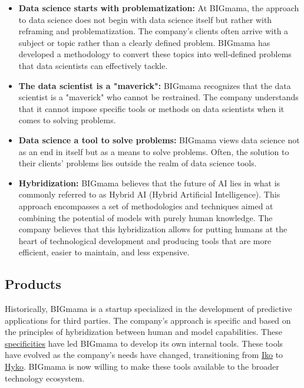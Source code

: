 \begin{itemize}
    \item \textbf{Data science starts with problematization:} At BIGmama, the approach to data science does not begin with data science itself but rather with reframing and problematization. The company's clients often arrive with a subject or topic rather than a clearly defined problem. BIGmama has developed a methodology to convert these topics into well-defined problems that data scientists can effectively tackle.

    \item \textbf{The data scientist is a "maverick":} BIGmama recognizes that the data scientist is a "maverick" who cannot be restrained. The company understands that it cannot impose specific tools or methods on data scientists when it comes to solving problems.

    \item \textbf{Data science a tool to solve problems:} BIGmama views data science not as an end in itself but as a means to solve problems. Often, the solution to their clients' problems lies outside the realm of data science tools.

    \item \textbf{Hybridization:} BIGmama believes that the future of AI lies in what is commonly referred to as Hybrid AI (Hybrid Artificial Intelligence). This approach encompasses a set of methodologies and techniques aimed at combining the potential of models with purely human knowledge. The company believes that this hybridization allows for putting humans at the heart of technological development and producing tools that are more efficient, easier to maintain, and less expensive.
\end{itemize}


\subsection{Products}

Historically, BIGmama is a startup specialized in the development of predictive applications for third parties. The company's approach is specific and based on the principles of hybridization between human and model capabilities. These \hyperref[specificities]{specificities} have led BIGmama to develop its own internal tools. These tools have evolved as the company's needs have changed, transitioning from \href{https://big-mama.io/en/iko}{Iko} to \href{https://www.hyko.ai}{Hyko}. BIGmama is now willing to make these tools available to the broader technology ecosystem.

